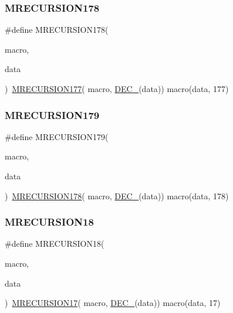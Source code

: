 \subsubsection{\texorpdfstring{MRECURSION178}{MRECURSION178}}
{\footnotesize\ttfamily \#define M\+R\+E\+C\+U\+R\+S\+I\+O\+N178(\begin{DoxyParamCaption}\item[{}]{macro,  }\item[{}]{data }\end{DoxyParamCaption})~\mbox{\hyperlink{group__group__sam0__utils__mrecursion_ga91b7223f3d5817342eec1d975ab07d8d}{M\+R\+E\+C\+U\+R\+S\+I\+O\+N177}}(  macro, \mbox{\hyperlink{group__group__sam0__utils__mrecursion_ga1d23d683797679dca8c3512a54a5dcae}{D\+E\+C\+\_\+}}(data))   macro(data, 177)}

\mbox{\label{group__group__sam0__utils__mrecursion_gaf2dbd67d5e3cf26998df6bf3bcb687c9}} 
\subsubsection{\texorpdfstring{MRECURSION179}{MRECURSION179}}
{\footnotesize\ttfamily \#define M\+R\+E\+C\+U\+R\+S\+I\+O\+N179(\begin{DoxyParamCaption}\item[{}]{macro,  }\item[{}]{data }\end{DoxyParamCaption})~\mbox{\hyperlink{group__group__sam0__utils__mrecursion_ga10c159986773d51f28784bb35f5dac4c}{M\+R\+E\+C\+U\+R\+S\+I\+O\+N178}}(  macro, \mbox{\hyperlink{group__group__sam0__utils__mrecursion_ga1d23d683797679dca8c3512a54a5dcae}{D\+E\+C\+\_\+}}(data))   macro(data, 178)}

\mbox{\label{group__group__sam0__utils__mrecursion_ga4aa4bb7bd93ea144f77973e50a8a2d2d}} 
\subsubsection{\texorpdfstring{MRECURSION18}{MRECURSION18}}
{\footnotesize\ttfamily \#define M\+R\+E\+C\+U\+R\+S\+I\+O\+N18(\begin{DoxyParamCaption}\item[{}]{macro,  }\item[{}]{data }\end{DoxyParamCaption})~\mbox{\hyperlink{group__group__sam0__utils__mrecursion_gad2d391ce496952ee9fda6f54753643f9}{M\+R\+E\+C\+U\+R\+S\+I\+O\+N17}}(  macro, \mbox{\hyperlink{group__group__sam0__utils__mrecursion_ga1d23d683797679dca8c3512a54a5dcae}{D\+E\+C\+\_\+}}(data))   macro(data, 17)}

